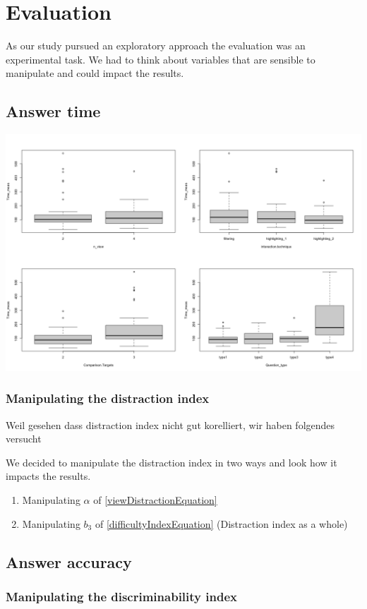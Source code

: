 \chapter{Evaluation}
As our study pursued an exploratory approach the evaluation was an experimental task. We had to think about variables that are sensible to
manipulate and could impact the results.

\section{Answer time}
\includegraphics[width=15.5cm]{images/boxplots.png}


\subsection{Manipulating the distraction index}
Weil gesehen dass distraction index nicht gut korelliert, wir haben folgendes versucht

We decided to manipulate the distraction index in two ways and look how it impacts the results.
\begin{enumerate}
    \item Manipulating $\alpha$ of \ref{viewDistractionEquation}
    \item Manipulating $b_3$ of \ref{difficultyIndexEquation} (Distraction index as a whole)
\end{enumerate}




\section{Answer accuracy}

\subsection{Manipulating the discriminability index}